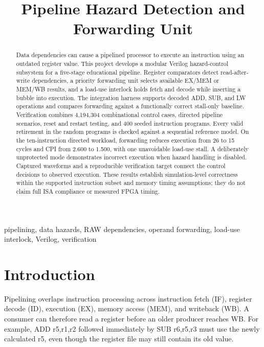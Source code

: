 \documentclass[conference]{IEEEtran}
\begin{document}
\title{Pipeline Hazard Detection and Forwarding Unit}
\author{
}
\maketitle

\begin{abstract}
Data dependencies can cause a pipelined processor to execute an instruction using an outdated register value. This project develops a modular Verilog hazard-control subsystem for a five-stage educational pipeline. Register comparators detect read-after-write dependencies, a priority forwarding unit selects available EX/MEM or MEM/WB results, and a load-use interlock holds fetch and decode while inserting a bubble into execution. The integration harness supports decoded ADD, SUB, and LW operations and compares forwarding against a functionally correct stall-only baseline. Verification combines 4,194,304 combinational control cases, directed pipeline scenarios, reset and restart testing, and 400 seeded instruction programs. Every valid retirement in the random programs is checked against a sequential reference model. On the ten-instruction directed workload, forwarding reduces execution from 26 to 15 cycles and CPI from 2.600 to 1.500, with one unavoidable load-use stall. A deliberately unprotected mode demonstrates incorrect execution when hazard handling is disabled. Captured waveforms and a reproducible verification target connect the control decisions to observed execution. These results establish simulation-level correctness within the supported instruction subset and memory timing assumptions; they do not claim full ISA compliance or measured FPGA timing.
\end{abstract}
\begin{IEEEkeywords}
pipelining, data hazards, RAW dependencies, operand forwarding, load-use interlock, Verilog, verification
\end{IEEEkeywords}

\section{Introduction}
Pipelining overlaps instruction processing across instruction fetch (IF), register decode (ID), execution (EX), memory access (MEM), and writeback (WB). A consumer can therefore read a register before an older producer reaches WB. For example, ADD r5,r1,r2 followed immediately by SUB r6,r5,r3 must use the newly calculated r5, even though the register file may still contain its old value.
\end{document}
